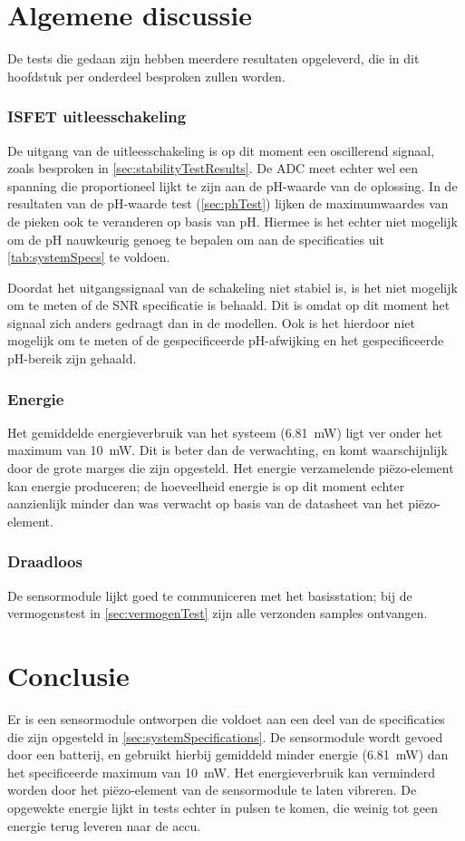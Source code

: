 \section{Algemene discussie}
De tests die gedaan zijn hebben meerdere resultaten opgeleverd, die in dit hoofdstuk per onderdeel besproken zullen worden.

\subsubsection*{ISFET uitleesschakeling}
De uitgang van de uitleesschakeling is op dit moment een oscillerend signaal, zoals besproken in \cref{sec:stabilityTestResults}. De ADC meet echter wel een spanning die proportioneel lijkt te zijn aan de pH-waarde van de oplossing.
In de resultaten van de pH-waarde test (\cref{sec:phTest}) lijken de maximumwaardes van de pieken ook te veranderen op basis van pH. Hiermee is het echter niet mogelijk om de pH nauwkeurig genoeg te bepalen om aan de specificaties uit \cref{tab:systemSpecs} te voldoen.

Doordat het uitgangssignaal van de schakeling niet stabiel is, is het niet mogelijk om te meten of de SNR specificatie is behaald. Dit is omdat op dit moment het signaal zich anders gedraagt dan in de modellen.
Ook is het hierdoor niet mogelijk om te meten of de gespecificeerde pH-afwijking en het gespecificeerde pH-bereik zijn gehaald.

\subsubsection*{Energie}
Het gemiddelde energieverbruik van het systeem (\qty{6.81}{\milli\watt}) ligt ver onder het maximum van \qty{10}{\milli\watt}. Dit is beter dan de verwachting, en komt waarschijnlijk door de grote marges die zijn opgesteld.
Het energie verzamelende piëzo-element kan energie produceren; de hoeveelheid energie is op dit moment echter aanzienlijk minder dan was verwacht op basis van de datasheet van het piëzo-element.

\subsubsection*{Draadloos}
De sensormodule lijkt goed te communiceren met het basisstation; bij de vermogenstest in \cref{sec:vermogenTest} zijn alle verzonden samples ontvangen.


\newpage
\section{Conclusie}
Er is een sensormodule ontworpen die voldoet aan een deel van de specificaties die zijn opgesteld in \cref{sec:systemSpecifications}. De sensormodule wordt gevoed door een batterij, en gebruikt hierbij gemiddeld minder energie (\qty{6.81}{\milli\watt}) dan het specificeerde maximum van \qty{10}{\milli\watt}. Het energieverbruik kan verminderd worden door het piëzo-element van de sensormodule te laten vibreren. De opgewekte energie lijkt in tests echter in pulsen te komen, die weinig tot geen energie terug leveren naar de accu.

